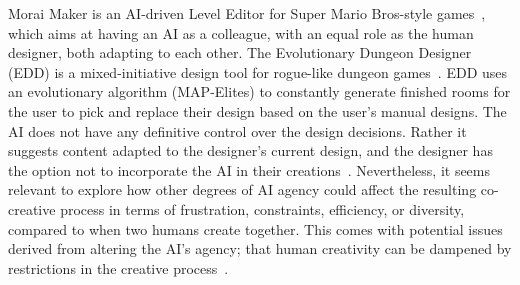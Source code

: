 



Morai Maker is an AI-driven Level Editor for Super Mario Bros-style games~\cite{p13guzdial_friend_2019}, which aims at having an AI as a colleague, with an equal role as the human designer, both adapting to each other. The Evolutionary Dungeon Designer (EDD) is a mixed-initiative design tool for rogue-like dungeon games~\cite{p13alvarez_fostering_2018}. EDD uses an evolutionary algorithm (MAP-Elites) to constantly generate finished rooms for the user to pick and replace their design based on the user's manual designs. The AI does not have any definitive control over the design decisions. Rather it suggests content adapted to the designer's current design, and the designer has the option not to incorporate the AI in their creations~\cite{p13alvarez_empowering_2019}. Nevertheless, it seems relevant to explore how other degrees of AI agency could affect the resulting co-creative process in terms of frustration, constraints, efficiency, or diversity, compared to when two humans create together. This comes with potential issues derived from altering the AI's agency; that human creativity can be dampened by restrictions in the creative process~\cite{p13yannakakis_mixed-initiative_2014}.


